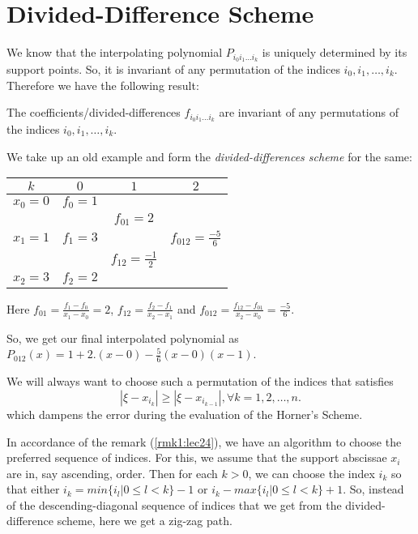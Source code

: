 
\section{Divided-Difference Scheme}
We know that the interpolating polynomial $P_{i_0i_1\ldots i_k}$ is uniquely determined by its support points. So, it is invariant of any permutation of the indices $ i_0,i_1,\ldots,i_k$. Therefore we have the following result:
\begin{thm}\label{thm1:lec24}
    The coefficients/divided-differences $f_{i_0i_1\ldots i_k}$ are invariant of any permutations of the indices $ i_0,i_1,\ldots,i_k$.
\end{thm}

\begin{example}\label{ex1:lec24}

We take up an old example and form the \textit{divided-differences scheme} for the same:
    \begin{center}
    \begin{tabular}{c|ccc}
        $k$ &  $0$ &  $1$ &  $2$\\
        \hline
        $x_0=0$ & $f_0=1$ & \\
                & & $f_{01}=2$ & \\
        $ x_1=1$ & $ f_1=3$ & & $f_{012} = \frac{-5}{6}$\\
                 & &  $ f_{12}=\frac{-1}{2}$ &\\
        $ x_2=3$ & $ f_2=2$ & \\
    \end{tabular}
    \end{center}

Here $f_{01} = \frac{f_1-f_0}{x_1-x_0} = 2$, $f_{12} = \frac{f_2-f_1}{x_2-x_1}$ and $f_{012} = \frac{f_{12}-f_{01}}{x_2-x_0} = \frac{-5}{6}$.
 
So, we get our final interpolated polynomial as $P_{012}(x) = 1+2.(x-0)-\frac{5}{6}(x-0)(x-1)$.
\end{example}

\begin{rmk}\label{rmk1:lec24}
    We will always want to choose such a permutation of the indices that satisfies
    \[
        |\xi - x_{i_k}| \ge  |\xi - x_{i_{k-1}}|, \forall k=1,2,\ldots,n
    .\] 
which dampens the error during the evaluation of the Horner's Scheme.
\end{rmk}

In accordance of the remark (\ref{rmk1:lec24}), we have an algorithm to choose the preferred sequence of indices. For this, we assume that the support abscissae $x_i$ are in, say ascending, order. Then for each  $k>0$, we can choose the index  $i_k$ so that either  $i_k = min\{i_l|0\le l<k\}-1$ or $i_k - max\{i_l|0\le l<k\}+1$. So, instead of the descending-diagonal sequence of indices that we get from the divided-difference scheme, here we get a zig-zag path.

